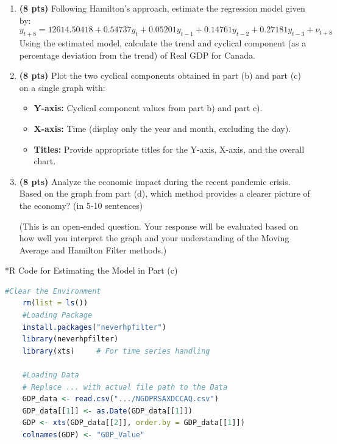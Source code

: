 \documentclass[addpoints,12pt,answers]{exam}
\begin{document}
\begin{enumerate}[label=\textbf{\arabic*.}, itemsep=15pt]
\begin{enumerate}[label=(\alph*)]
		\item \textbf{(8 pts)} Following Hamilton's approach, estimate the regression model given by:
		\[
		y_{t+8} = 12614.50418 + 0.54737 y_{t} + 0.05201 y_{t-1} + 0.14761 y_{t-2} + 0.27181 y_{t-3} + \nu_{t+8}
		\]
		Using the estimated model, calculate the trend and cyclical component (as a percentage deviation from the trend) of Real GDP for Canada.
		
		\item \textbf{(8 pts)} Plot the two cyclical components obtained in part (b) and part (c) on a single graph with:
		\begin{itemize}
			\item \textbf{Y-axis:} Cyclical component values from part b) and part c).
			\item \textbf{X-axis:} Time (display only the year and month, excluding the day).
			\item \textbf{Titles:} Provide appropriate titles for the Y-axis, X-axis, and the overall chart.
		\end{itemize}
		
		\item \textbf{(8 pts)} Analyze the economic impact during the recent pandemic crisis. Based on the graph from part (d), which method provides a clearer picture of the economy?  (in 5-10 sentences)
		
		(This is an open-ended question. Your response will be evaluated based on how well you interpret the graph and your understanding of the Moving Average and Hamilton Filter methods.)
	\end{enumerate}

\clearpage
*R Code for Estimating the Model in Part (c)
\begin{lstlisting}[language=R]
	#Clear the Environment
	rm(list = ls())
	#Loading Package
	install.packages("neverhpfilter")
	library(neverhpfilter)
	library(xts)     # For time series handling
	
	#Loading Data
	# Replace ... with actual file path to the Data
	GDP_data <- read.csv(".../NGDPRSAXDCCAQ.csv")  
	GDP_data[[1]] <- as.Date(GDP_data[[1]])
	GDP <- xts(GDP_data[[2]], order.by = GDP_data[[1]])
	colnames(GDP) <- "GDP_Value"
	

\end{lstlisting}
\end{enumerate}
\end{document}
